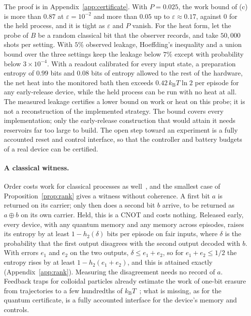 \documentclass[11pt]{article}
\theoremstyle{definition}
\theoremstyle{remark}
\newcommand{\kB}{k_{\mathrm B}}
\begin{document}
The proof is in Appendix~\ref{app:certificate}. With $P=0.025$, the work bound of (c) is more than $0.87$ at $\varepsilon=10^{-2}$ and more than $0.05$ up to $\varepsilon\approx0.17$, against $0$ for the held process, and it is tight as $\varepsilon$ and $P$ vanish. For the heat form, let the probe of $B$ be a random classical bit that the observer records, and take $50{,}000$ shots per setting. With $5\%$ observed leakage, Hoeffding's inequality and a union bound over the three settings keep the leakage below $7\%$ except with probability below $3\times10^{-4}$. With a readout calibrated for every input state, a preparation entropy of $0.99$ bits and $0.08$ bits of entropy allowed to the rest of the hardware, the net heat into the monitored bath then exceeds $0.42\,\kB T\ln2$ per episode for any early-release device, while the held process can be run with no heat at all. The measured leakage certifies a lower bound on work or heat on this probe; it is not a reconstruction of the implemented strategy. The bound covers every implementation; only the early-release construction that would attain it needs reservoirs far too large to build. The open step toward an experiment is a fully accounted reset and control interface, so that the controller and battery budgets of a real device can be certified.

\paragraph{A classical witness.} Order costs work for classical processes as well~\cite{Answering}, and the smallest case of Proposition~\ref{prop:rank} gives a witness without coherence. A first bit $a$ is returned on its carrier; only then does a second bit $b$ arrive, to be returned as $a\oplus b$ on its own carrier. Held, this is a CNOT and costs nothing. Released early, every device, with any quantum memory and any memory across episodes, raises its entropy by at least $1-h_2(\delta)$ bits per episode on fair inputs, where $\delta$ is the probability that the first output disagrees with the second output decoded with $b$. With errors $e_1$ and $e_2$ on the two outputs, $\delta\le e_1+e_2$, so for $e_1+e_2\le1/2$ the entropy rises by at least $1-h_2(e_1+e_2)$, and this is attained exactly (Appendix~\ref{app:rank}). Measuring the disagreement needs no record of $a$. Feedback traps for colloidal particles already estimate the work of one-bit erasure from trajectories to a few hundredths of $\kB T$~\cite{Jun14}; what is missing, as for the quantum certificate, is a fully accounted interface for the device's memory and controls.
\end{document}
